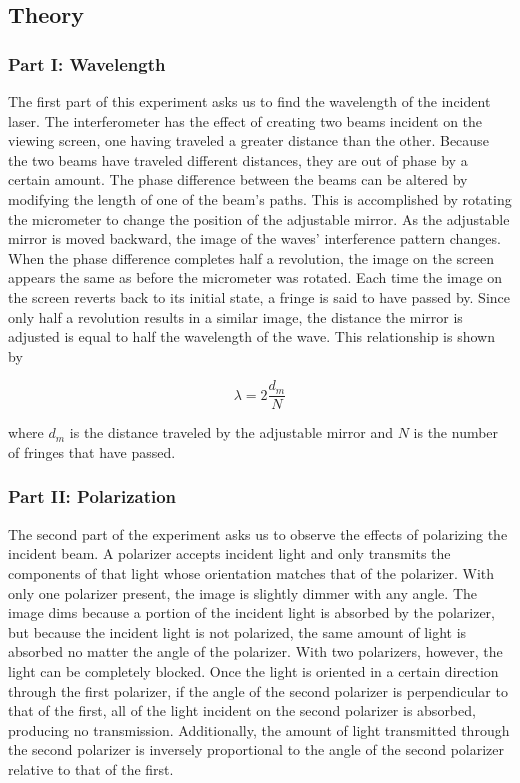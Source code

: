 \documentclass[12pt]{article}
\begin{document}
\subsection{Theory}

\subsubsection{Part I: Wavelength}

\qq The first part of this experiment asks us to find the wavelength of the
incident laser. The interferometer has the effect of creating two beams incident
on the viewing screen, one having traveled a greater distance than the
other. Because the two beams have traveled different distances, they are out of
phase by a certain amount. The phase difference between the beams can be altered
by modifying the length of one of the beam's paths. This is accomplished by
rotating the micrometer to change the position of the adjustable mirror. As the
adjustable mirror is moved backward, the image of the waves' interference
pattern changes. When the phase difference completes half a revolution, the
image on the screen appears the same as before the micrometer was rotated. Each
time the image on the screen reverts back to its initial state, a fringe is said
to have passed by. Since only half a revolution results in a similar image, the
distance the mirror is adjusted is equal to half the wavelength of the
wave. This relationship is shown by

\begin{equation}
\label{eqn:wavelengthViaFringes}
  \lambda = 2 \frac{d_m}{N}
\end{equation}

where \(d_m\) is the distance traveled by the adjustable mirror and \(N\) is the
number of fringes that have passed. 

\subsubsection{Part II: Polarization}

\qq The second part of the experiment asks us to observe the effects of
polarizing the incident beam. A polarizer accepts incident light and only
transmits the components of that light whose orientation matches that of the
polarizer. With only one polarizer present, the image is slightly dimmer with any
angle. The image dims because a portion of the incident light is absorbed by the
polarizer, but because the incident light is not polarized, the same amount of
light is absorbed no matter the angle of the polarizer. With two polarizers,
however, the light can be completely blocked. Once the light is oriented in a
certain direction through the first polarizer, if the angle of the second
polarizer is perpendicular to that of the first, all of the light incident on
the second polarizer is absorbed, producing no transmission. Additionally, the
amount of light transmitted through the second polarizer is inversely
proportional to the angle of the second polarizer relative to that of the
first.  
\end{document}
